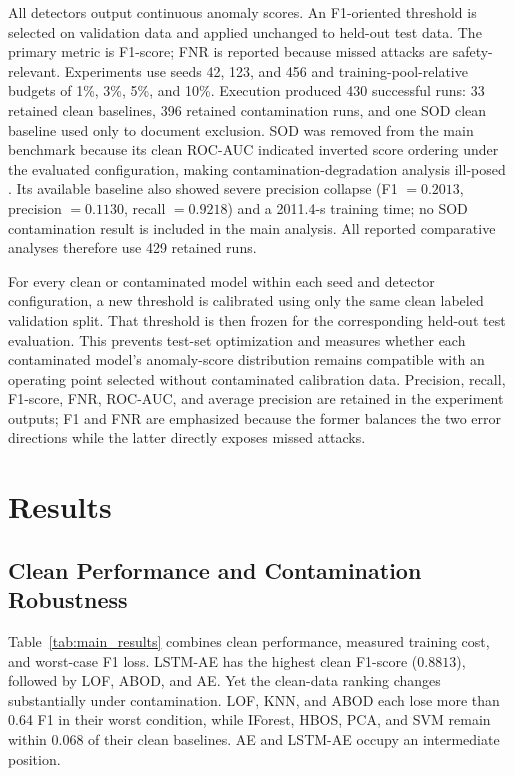 \documentclass[10pt,conference]{IEEEtran}
\begin{document}
All detectors output continuous anomaly scores. An F1-oriented threshold is selected on validation data and applied unchanged to held-out test data. The primary metric is F1-score; FNR is reported because missed attacks are safety-relevant. Experiments use seeds 42, 123, and 456 and training-pool-relative budgets of 1\%, 3\%, 5\%, and 10\%. Execution produced 430 successful runs: 33 retained clean baselines, 396 retained contamination runs, and one SOD clean baseline used only to document exclusion. SOD was removed from the main benchmark because its clean ROC-AUC indicated inverted score ordering under the evaluated configuration, making contamination-degradation analysis ill-posed \cite{kriegel2009sod}. Its available baseline also showed severe precision collapse (F1 $=0.2013$, precision $=0.1130$, recall $=0.9218$) and a 2011.4-s training time; no SOD contamination result is included in the main analysis. All reported comparative analyses therefore use 429 retained runs.

For every clean or contaminated model within each seed and detector configuration, a new threshold is calibrated using only the same clean labeled validation split. That threshold is then frozen for the corresponding held-out test evaluation. This prevents test-set optimization and measures whether each contaminated model's anomaly-score distribution remains compatible with an operating point selected without contaminated calibration data. Precision, recall, F1-score, FNR, ROC-AUC, and average precision are retained in the experiment outputs; F1 and FNR are emphasized because the former balances the two error directions while the latter directly exposes missed attacks.

\section{Results}

\subsection{Clean Performance and Contamination Robustness}

Table~\ref{tab:main_results} combines clean performance, measured training cost, and worst-case F1 loss. LSTM-AE has the highest clean F1-score ($0.8813$), followed by LOF, ABOD, and AE. Yet the clean-data ranking changes substantially under contamination. LOF, KNN, and ABOD each lose more than 0.64 F1 in their worst condition, while IForest, HBOS, PCA, and SVM remain within 0.068 of their clean baselines. AE and LSTM-AE occupy an intermediate position.
\end{document}
